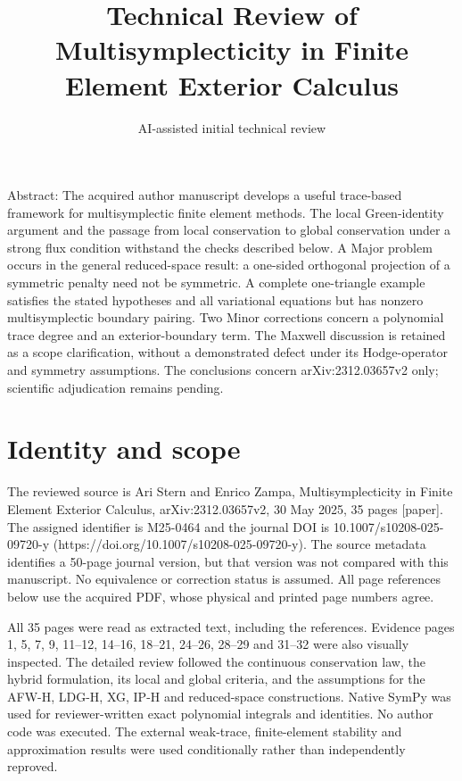 \documentclass[10pt]{article}
\title{Technical Review of
Multisymplecticity in Finite Element Exterior Calculus}
\author{AI-assisted initial technical review}
\date{}
\begin{document}
\maketitle
Abstract: The acquired author manuscript develops a useful trace-based framework for multisymplectic finite element methods. The local Green-identity argument and the passage from local conservation to global conservation under a strong flux condition withstand the checks described below. A Major problem occurs in the general reduced-space result: a one-sided orthogonal projection of a symmetric penalty need not be symmetric. A complete one-triangle example satisfies the stated hypotheses and all variational equations but has nonzero multisymplectic boundary pairing. Two Minor corrections concern a polynomial trace degree and an exterior-boundary term. The Maxwell discussion is retained as a scope clarification, without a demonstrated defect under its Hodge-operator and symmetry assumptions. The conclusions concern arXiv:2312.03657v2 only; scientific adjudication remains pending.\par
\section*{Identity and scope}
The reviewed source is Ari Stern and Enrico Zampa, Multisymplecticity in Finite Element Exterior Calculus, arXiv:2312.03657v2, 30 May 2025, 35 pages [paper]. The assigned identifier is M25-0464 and the journal DOI is 10.1007/s10208-025-09720-y (https://doi.org/10.1007/s10208-025-09720-y). The source metadata identifies a 50-page journal version, but that version was not compared with this manuscript. No equivalence or correction status is assumed. All page references below use the acquired PDF, whose physical and printed page numbers agree.\par
All 35 pages were read as extracted text, including the references. Evidence pages 1, 5, 7, 9, 11–12, 14–16, 18–21, 24–26, 28–29 and 31–32 were also visually inspected. The detailed review followed the continuous conservation law, the hybrid formulation, its local and global criteria, and the assumptions for the AFW-H, LDG-H, XG, IP-H and reduced-space constructions. Native SymPy was used for reviewer-written exact polynomial integrals and identities. No author code was executed. The external weak-trace, finite-element stability and approximation results were used conditionally rather than independently reproved.\par
\end{document}
